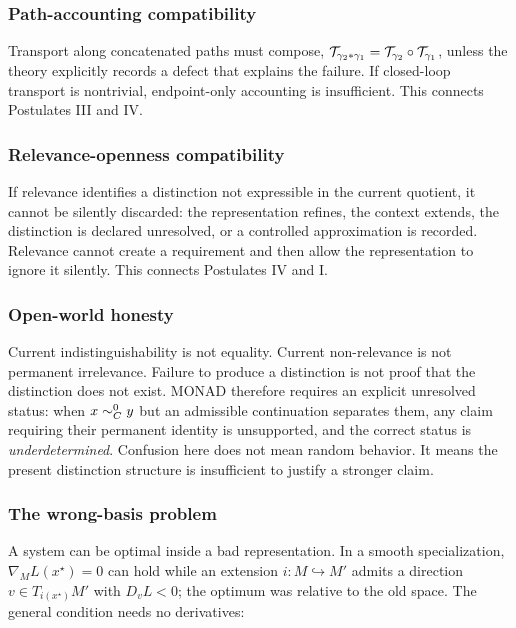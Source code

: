 \subsubsection{Path-accounting compatibility}
Transport along concatenated paths must compose,
$\mathcal{T}_{\gamma_2 * \gamma_1} = \mathcal{T}_{\gamma_2} \circ
\mathcal{T}_{\gamma_1}$, unless the theory explicitly records a
defect that explains the failure. If closed-loop transport is
nontrivial, endpoint-only accounting is insufficient. This connects
Postulates III and IV\@.

\subsubsection{Relevance-openness compatibility}
If relevance identifies a distinction not expressible in the current
quotient, it cannot be silently discarded: the representation
refines, the context extends, the distinction is declared
unresolved, or a controlled approximation is recorded. Relevance
cannot create a requirement and then allow the representation to
ignore it silently. This connects Postulates IV and I.

\subsubsection{Open-world honesty}

Current indistinguishability is not equality. Current non-relevance is
not permanent irrelevance. Failure to produce a distinction is not
proof that the distinction does not exist. MONAD therefore requires an
explicit unresolved status: when $x \sim^{0}_{C} y$ but an admissible
continuation separates them, any claim requiring their permanent
identity is unsupported, and the correct status is
\emph{underdetermined}. Confusion here does not mean random behavior.
It means the present distinction structure is insufficient to justify
a stronger claim.

\subsubsection{The wrong-basis problem}

A system can be optimal inside a bad representation. In a smooth
specialization, $\nabla_M L(x^{\star}) = 0$ can hold while an
extension $i : M \hookrightarrow M'$ admits a direction
$v \in T_{i(x^{\star})} M'$ with $D_v L < 0$; the optimum was relative
to the old space. The general condition needs no derivatives:

